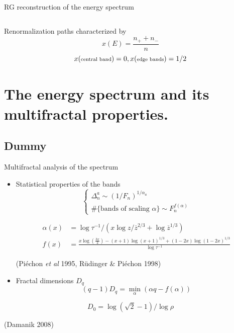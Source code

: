 \documentclass[xcolor=x11names,compress,professionalfonts]{beamer}
\renewcommand{\(}{\begin{columns}}
\renewcommand{\)}{\end{columns}}
\newcommand{\<}[1]{\begin{column}{#1}}
\renewcommand{\>}{\end{column}}
\newcommand{\zb}{\ensuremath{\overline{z}}}
\begin{document}
\begin{frame}{RG reconstruction of the energy spectrum}
\begin{columns}
\begin{column}{6cm}
	\end{column}
	\end{columns}
	Renormalization paths characterized by
	\[ 
		x(E) = \frac{n_+ + n_-}{n} 
	\]
	\[ 
		x(\text{\scriptsize{central band}}) = 0, x(\text{\scriptsize{edge bands}}) = 1/2
	\]
\end{frame}

\section{The energy spectrum and its multifractal properties.}
\subsection{Dummy}
\begin{frame}{Multifractal analysis of the spectrum}

%	
%

	\begin{itemize}
		\item 	Statistical properties of the bands
		\[
	\begin{cases}
	\Delta_n^a \sim (1/F_n)^{1/\alpha_a} \\
	\#\{\text{bands of scaling~} \alpha \} \sim F_n^{f(\alpha)} 
	\end{cases}
	\]
	
		\begin{align*}
		\alpha(x) &= \log \tau^{-1}/\left( x \log z/\zb^{2/3} + \log \zb^{1/3} \right) \\
		f(x) &= \frac{x \log \left(\frac{3 x}{2}\right)- (x+1) \log (x+1)^{1/3}+ (1-2 x) \log (1-2 x)^{1/3}}{\log \tau^{-1}}
	\end{align*}
	\begin{flushright}
	(Piéchon \emph{et al} 1995, Rüdinger \& Piéchon 1998)
	\end{flushright}
		\item Fractal dimensions $D_q$
			\[
				(q-1)D_q = \min_\alpha(\alpha q - f(\alpha))
			\]
	\end{itemize}
	\[ D_0 = \log(\sqrt{2}-1) / \log \rho \]
	\begin{flushright}
	(Damanik 2008)
	\end{flushright}
\end{frame}
\end{document}
